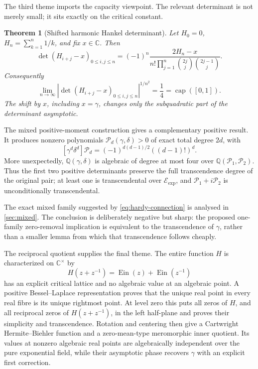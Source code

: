 \documentclass[11pt]{article}
\newtheorem{theorem}{Theorem}[section]
\theoremstyle{definition}
\theoremstyle{remark}
\newcommand{\Q}{\mathbb Q}
\newcommand{\C}{\mathbb C}
\newcommand{\Ein}{\operatorname{Ein}}
\newcommand{\Eexp}{\mathcal E_{\mathrm{exp}}}
\newcommand{\capc}{\operatorname{cap}}
\begin{document}
The third theme imports the capacity viewpoint.  The relevant determinant is
not merely small; it sits exactly on the critical constant.

\begin{theorem}[Shifted harmonic Hankel determinant]\label{thm:hankel-intro}
Let \(H_0=0\), \(H_n=\sum_{k=1}^n1/k\), and fix \(x\in\C\).  Then
\begin{equation}\label{eq:hankel-intro}
 \det(H_{i+j}-x)_{0\le i,j\le n}
 =(-1)^n\frac{2H_n-x}
 {n!\displaystyle\prod_{j=1}^n\binom{2j}{j}\binom{2j-1}{j}}.
\end{equation}
Consequently
\[
 \lim_{n\to\infty}
 \left|\det(H_{i+j}-x)_{0\le i,j\le n}\right|^{1/n^2}=\frac14
 =\capc([0,1]).
\]
The shift by \(x\), including \(x=\gamma\), changes only the
subquadratic part of the determinant asymptotic.
\end{theorem}

The mixed positive-moment construction gives a complementary positive
result.  It produces nonzero polynomials
\(\mathcal P_d(\gamma,\delta)>0\) of exact total degree \(2d\), with
\[
 [\gamma^d\delta^d]\mathcal P_d
 =(-1)^{d(d-1)/2}((d-1)!)^d.
\]
More unexpectedly, \(\Q(\gamma,\delta)\) is algebraic of degree at most
four over \(\Q(\mathcal P_1,\mathcal P_2)\).  Thus the first two positive
determinants preserve the full transcendence degree of the original pair;
at least one is transcendental over \(\Eexp\), and
\(\mathcal P_1+i\mathcal P_2\) is unconditionally transcendental.

The exact mixed family suggested by \eqref{eq:hardy-connection} is analysed in
\cref{sec:mixed}.  The conclusion is deliberately negative but sharp: the
proposed one-family zero-removal implication is equivalent to the
transcendence of \(\gamma\), rather than a smaller lemma from which that
transcendence follows cheaply.

The reciprocal quotient supplies the final theme.  The entire function \(H\)
is characterized on \(\C^\times\) by
\[
 H(z+z^{-1})=\Ein(z)+\Ein(z^{-1})
\]
has an explicit critical lattice and no algebraic value at an algebraic
point.  A positive Bessel--Laplace representation proves that the unique real
point in every real fibre is its unique rightmost point.  At level zero this
puts all zeros of \(H\), and all reciprocal zeros of \(H(z+z^{-1})\), in the
left half-plane and proves their simplicity and transcendence.  Rotation and
centering then give a Cartwright Hermite--Biehler function and a
zero-mean-type meromorphic inner quotient.  Its values at nonzero algebraic
real points are algebraically independent over the pure exponential field,
while their asymptotic phase recovers \(\gamma\) with an explicit first
correction.
\end{document}
